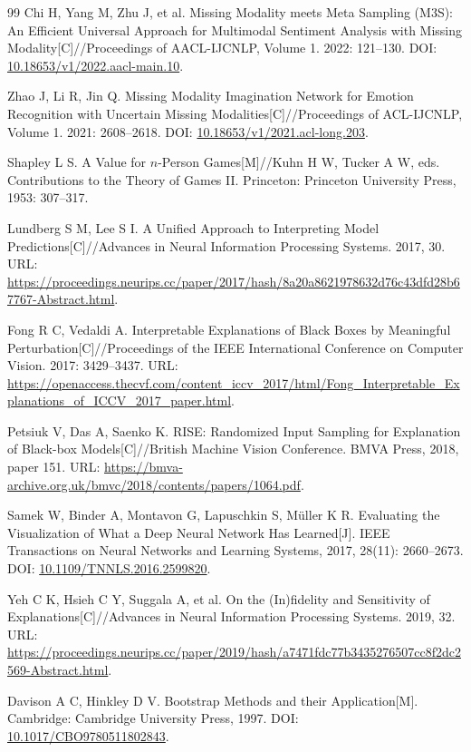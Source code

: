 {\begin{thebibliography}{99}
 Chi H, Yang M, Zhu J, et al. Missing Modality meets Meta Sampling (M3S): An Efficient Universal Approach for Multimodal Sentiment Analysis with Missing Modality[C]//Proceedings of AACL-IJCNLP, Volume 1. 2022: 121--130. DOI: \url{10.18653/v1/2022.aacl-main.10}.

 Zhao J, Li R, Jin Q. Missing Modality Imagination Network for Emotion Recognition with Uncertain Missing Modalities[C]//Proceedings of ACL-IJCNLP, Volume 1. 2021: 2608--2618. DOI: \url{10.18653/v1/2021.acl-long.203}.

 Shapley L S. A Value for $n$-Person Games[M]//Kuhn H W, Tucker A W, eds. Contributions to the Theory of Games II. Princeton: Princeton University Press, 1953: 307--317.

 Lundberg S M, Lee S I. A Unified Approach to Interpreting Model Predictions[C]//Advances in Neural Information Processing Systems. 2017, 30. URL: \url{https://proceedings.neurips.cc/paper/2017/hash/8a20a8621978632d76c43dfd28b67767-Abstract.html}.

 Fong R C, Vedaldi A. Interpretable Explanations of Black Boxes by Meaningful Perturbation[C]//Proceedings of the IEEE International Conference on Computer Vision. 2017: 3429--3437. URL: \url{https://openaccess.thecvf.com/content_iccv_2017/html/Fong_Interpretable_Explanations_of_ICCV_2017_paper.html}.

 Petsiuk V, Das A, Saenko K. RISE: Randomized Input Sampling for Explanation of Black-box Models[C]//British Machine Vision Conference. BMVA Press, 2018, paper 151. URL: \url{https://bmva-archive.org.uk/bmvc/2018/contents/papers/1064.pdf}.

 Samek W, Binder A, Montavon G, Lapuschkin S, M\"uller K R. Evaluating the Visualization of What a Deep Neural Network Has Learned[J]. IEEE Transactions on Neural Networks and Learning Systems, 2017, 28(11): 2660--2673. DOI: \url{10.1109/TNNLS.2016.2599820}.

 Yeh C K, Hsieh C Y, Suggala A, et al. On the (In)fidelity and Sensitivity of Explanations[C]//Advances in Neural Information Processing Systems. 2019, 32. URL: \url{https://proceedings.neurips.cc/paper/2019/hash/a7471fdc77b3435276507cc8f2dc2569-Abstract.html}.

 Davison A C, Hinkley D V. Bootstrap Methods and their Application[M]. Cambridge: Cambridge University Press, 1997. DOI: \url{10.1017/CBO9780511802843}.


\end{thebibliography}}
